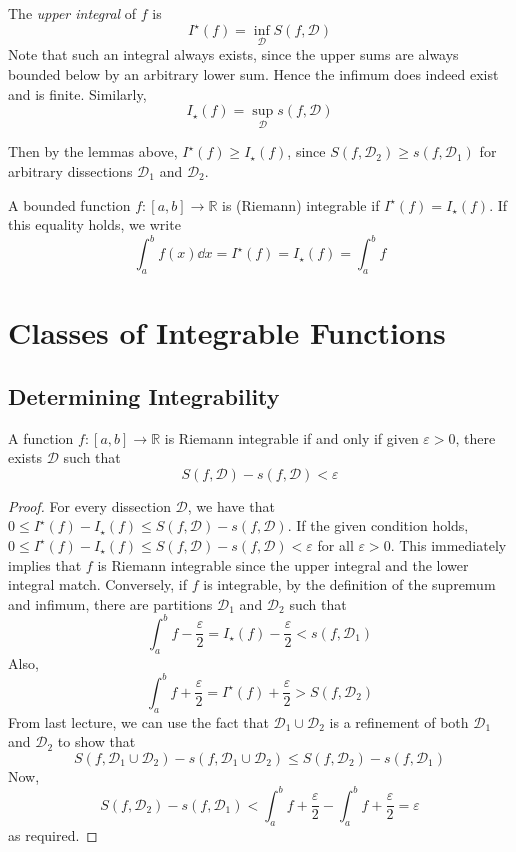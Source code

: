 \documentclass{article}
\begin{document}
\begin{definition}
	The \textit{upper integral} of $f$ is
	\[ I^\star(f) = \inf_{\mathcal D} S(f, \mathcal D) \]
	Note that such an integral always exists, since the upper sums are always bounded below by an arbitrary lower sum. Hence the infimum does indeed exist and is finite. Similarly,
	\[ I_\star(f) = \sup_{\mathcal D} s(f, \mathcal D) \]
\end{definition}
\noindent Then by the lemmas above, $I^\star(f) \geq I_\star(f)$, since $S(f, \mathcal D_2) \geq s(f, \mathcal D_1)$ for arbitrary dissections $\mathcal D_1$ and $\mathcal D_2$.
\begin{definition}
	A bounded function $f \colon [a, b] \to \mathbb R$ is (Riemann) integrable if $I^\star(f) = I_\star(f)$. If this equality holds, we write
	\[ \int_a^b f(x) \dd{x} = I^\star(f) = I_\star(f) = \int_a^b f \]
\end{definition}

\section{Classes of Integrable Functions}
\subsection{Determining Integrability}
\begin{theorem}
	A function $f \colon [a, b] \to \mathbb R$ is Riemann integrable if and only if given $\varepsilon > 0$, there exists $\mathcal D$ such that
	\[ S(f, \mathcal D) - s(f, \mathcal D) < \varepsilon \]
\end{theorem}
\begin{proof}
	For every dissection $\mathcal D$, we have that $0 \leq I^\star(f) - I_\star(f) \leq S(f, \mathcal D) - s(f, \mathcal D)$. If the given condition holds, $0 \leq I^\star(f) - I_\star(f) \leq S(f, \mathcal D) - s(f, \mathcal D) < \varepsilon$ for all $\varepsilon > 0$. This immediately implies that $f$ is Riemann integrable since the upper integral and the lower integral match. Conversely, if $f$ is integrable, by the definition of the supremum and infimum, there are partitions $\mathcal D_1$ and $\mathcal D_2$ such that
	\[ \int_a^b f - \frac{\varepsilon}{2} = I_\star(f) - \frac{\varepsilon}{2} < s(f, \mathcal D_1) \]
	Also,
	\[ \int_a^b f + \frac{\varepsilon}{2} = I^\star(f) + \frac{\varepsilon}{2} > S(f, \mathcal D_2) \]
	From last lecture, we can use the fact that $\mathcal D_1 \cup \mathcal D_2$ is a refinement of both $\mathcal D_1$ and $\mathcal D_2$ to show that
	\[ S(f, \mathcal D_1 \cup \mathcal D_2) - s(f, \mathcal D_1 \cup \mathcal D_2) \leq S(f, \mathcal D_2) - s(f, \mathcal D_1) \]
	Now,
	\[ S(f, \mathcal D_2) - s(f, \mathcal D_1) < \int_a^b f + \frac{\varepsilon}{2} - \int_a^b f + \frac{\varepsilon}{2} = \varepsilon \]
	as required.
\end{proof}
\end{document}
